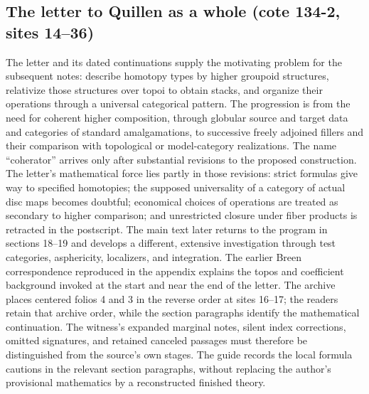\documentclass[10pt,oneside]{book}
\begin{document}
\subsection*{The letter to Quillen as a whole (cote 134-2, sites 14--36)}
The letter and its dated continuations supply the motivating problem for the subsequent notes: describe homotopy types by higher groupoid structures, relativize those structures over topoi to obtain stacks, and organize their operations through a universal categorical pattern. The progression is from the need for coherent higher composition, through globular source and target data and categories of standard amalgamations, to successive freely adjoined fillers and their comparison with topological or model-category realizations. The name ``coherator'' arrives only after substantial revisions to the proposed construction. The letter's mathematical force lies partly in those revisions: strict formulas give way to specified homotopies; the supposed universality of a category of actual disc maps becomes doubtful; economical choices of operations are treated as secondary to higher comparison; and unrestricted closure under fiber products is retracted in the postscript. The main text later returns to the program in sections 18--19 and develops a different, extensive investigation through test categories, asphericity, localizers, and integration. The earlier Breen correspondence reproduced in the appendix explains the topos and coefficient background invoked at the start and near the end of the letter. The archive places centered folios 4 and 3 in the reverse order at sites 16--17; the readers retain that archive order, while the section paragraphs identify the mathematical continuation. The witness's expanded marginal notes, silent index corrections, omitted signatures, and retained canceled passages must therefore be distinguished from the source's own stages. The guide records the local formula cautions in the relevant section paragraphs, without replacing the author's provisional mathematics by a reconstructed finished theory.
\end{document}
